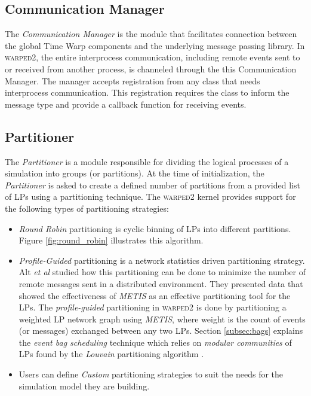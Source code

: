 \documentclass[11pt]{book}
\begin{document}
\subsection{Communication Manager}\label{subsec:communication_manager}

The \emph{Communication Manager} is the module that facilitates connection between the global Time Warp
components and the underlying message passing library.  In \textsc{warped2}, the entire interprocess
communication, including remote events sent to or received from another process, is channeled through the this
Communication Manager.  The manager accepts registration from any class that needs interprocess communication.
This registration requires the class to inform the message type and provide a callback function for receiving
events.

\subsection{Partitioner}\label{subsec:partitioner}

The \emph{Partitioner} is a module responsible for dividing the logical processes of a simulation into groups
(or partitions).  At the time of initialization, the \emph{Partitioner} is asked to create a defined number of
partitions from a provided list of LPs using a partitioning technique.  The \textsc{warped2} kernel provides
support for the following types of partitioning strategies:

\begin{itemize}

\item \emph{Round Robin} partitioning is cyclic binning of LPs into different partitions.  Figure
  \ref{fig:round_robin} illustrates this algorithm.

\item \emph{Profile-Guided} partitioning is a network statistics driven partitioning strategy. Alt \emph{et
  al} \cite{alt-14} studied how this partitioning can be done to minimize the number of remote messages sent
  in a distributed environment. They presented data that showed the effectiveness of \emph{METIS}
  \cite{karypis-98} as an effective partitioning tool for the LPs. The \emph{profile-guided} partitioning in
  \textsc{warped2} is done by partitioning a weighted LP network graph using \emph{METIS}, where weight is the
  count of events (or messages) exchanged between any two LPs. Section \ref{subsec:bags} explains the
  \emph{event bag scheduling} technique which relies on \emph{modular communities} of LPs found by the
  \emph{Louvain} partitioning algorithm \cite{blondel-08}.
    
\item Users can define \emph{Custom} partitioning strategies to suit the needs for the simulation model they
  are building.

\end{itemize}
\end{document}
